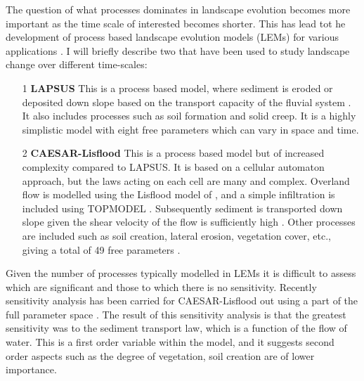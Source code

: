 The question of what processes dominates in landscape evolution becomes more important as the time scale of interested becomes shorter. This has lead tot he development of process based landscape evolution models (LEMs) for various applications \citep[see for example][]{temme-etal-2017}. I will briefly describe two that have been used to study landscape change over different time-scales:
\begin{itemize}
\item[1] {\bf LAPSUS}
This is a process based model, where sediment is eroded or deposited down slope based on the transport capacity of the fluvial system \citep{schoorl-etal-2000}. It also includes processes such as soil formation and solid creep. It is a highly simplistic model with eight free parameters which can vary in space and time.
\item[2] {\bf CAESAR-Lisflood}
This is a process based model but of increased complexity compared to LAPSUS. It is based on a cellular automaton approach, but the laws acting on each cell are many and complex. Overland flow is modelled using the Lisflood model of \cite{bates-etal-2010}, and a simple infiltration is included using TOPMODEL \citep{beven-1979}. Subsequently sediment is transported down slope given the shear velocity of the flow is sufficiently high \citep{coulthard-etal-2013,vandeweil-etal-2007}. Other processes are included such as soil creation, lateral erosion, vegetation cover, etc., giving a total of 49 free parameters \citep{skinner-etal-2018}.
\end{itemize}
Given the number of processes typically modelled in LEMs it is difficult to assess which are significant and those to which there is no sensitivity. Recently sensitivity analysis has been carried for CAESAR-Lisflood out using a part of the full parameter space \citep{skinner-etal-2018}. The result of this sensitivity analysis is that the greatest sensitivity was to the sediment transport law, which is a function of the flow of water. This is a first order variable within the model, and it suggests second order aspects such as the degree of vegetation, soil creation are of lower importance.

